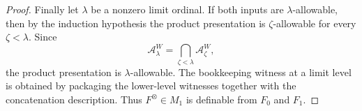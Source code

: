 \documentclass[10pt,a4paper]{amsart}
\begin{document}
\begin{proof}
Finally let \(\lambda\) be a nonzero limit ordinal.  If both inputs are
\(\lambda\)-allowable, then by the induction hypothesis the product
presentation is \(\zeta\)-allowable for every \(\zeta<\lambda\).  Since
\[
   \mathcal A^W_\lambda
   =
   \bigcap_{\zeta<\lambda}\mathcal A^W_\zeta,
\]
the product presentation is \(\lambda\)-allowable.  The bookkeeping witness at
a limit level is obtained by packaging the lower-level witnesses together with
the concatenation description.  Thus \(F^\otimes\in M_1\) is definable from
\(F_0\) and \(F_1\).
\end{proof}
\end{document}
